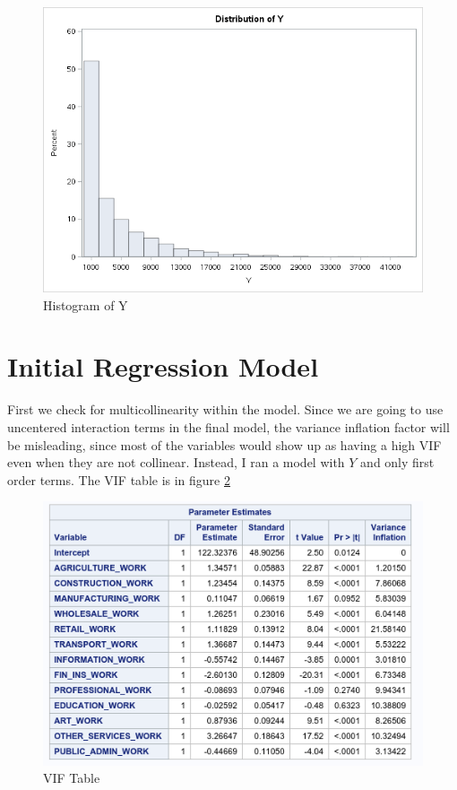 \begin{figure}
\centering
\includegraphics{Chapters/y_hist.png}
\caption{Histogram of Y}
\label{fig:y_hist}
\end{figure}




\section{Initial Regression Model}

First we check for multicollinearity within the model. Since we are going to use uncentered interaction terms in the final model, the variance inflation factor will be misleading, since most of the variables would show up as having a high VIF even when they are not collinear. Instead, I ran a model with $Y$ and only first order terms. The VIF table is in figure \ref{fig:vif}

\begin{figure}
\centering
\includegraphics{Chapters/collinear.png}
\caption{VIF Table}
\label{fig:vif}
\end{figure}

